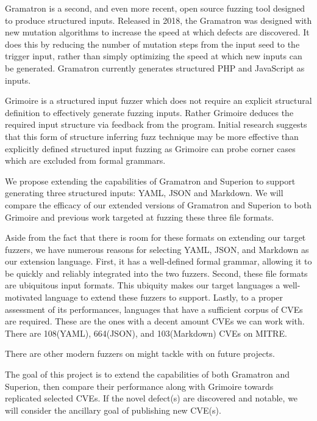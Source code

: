 \documentclass[12pt]{diazessay}
\begin{document}
Gramatron\cite{srivastava2021gramatron} is a second, and even more recent, open source fuzzing tool designed to produce structured inputs.
Released in 2018, the Gramatron was designed with new mutation algorithms to increase the speed at which defects are discovered.
It does this by reducing the number of mutation steps from the input seed to the trigger input, rather than simply optimizing the speed at which new inputs can be generated.
Gramatron currently generates structured PHP and JavaScript as inputs.

Grimoire\cite{GRIMOIRE} is a structured input fuzzer which does not require an explicit structural definition to effectively generate fuzzing inputs.
Rather Grimoire deduces the required input structure via feedback from the program.
Initial research suggests that this form of structure inferring fuzz technique may be more effective than explicitly defined structured input fuzzing as Grimoire can probe corner cases which are excluded from formal grammars.

We propose extending the capabilities of Gramatron and Superion to support generating three structured inputs: YAML\cite{YAMLdraft}, JSON and Markdown.
We will compare the efficacy of our extended versions of Gramatron and Superion to both Grimoire and previous work targeted at fuzzing these three file formats.

Aside from the fact that there is room for these formats on extending our target fuzzers, we have numerous reasons for selecting YAML, JSON, and Markdown as our extension language.
First, it has a well-defined formal grammar, allowing it to be quickly and reliably integrated into the two fuzzers.
Second, these file formats are ubiquitous input formats.
This ubiquity makes our target languages a well-motivated language to extend these fuzzers to support.
Lastly, to a proper assessment of its performances, languages that have a sufficient corpus of CVEs are required. 
These are the ones with a decent amount CVEs we can work with.
There are 108(YAML), 664(JSON), and 103(Markdown) CVEs on MITRE\cite{MITRE}.

There are other modern fuzzers on might tackle with on future projects.

The goal of this project is to extend the capabilities of both Gramatron and Superion, then compare their performance along with Grimoire towards replicated selected CVEs.
If the novel defect(s) are discovered and notable, we will consider the ancillary goal of publishing new CVE(s).
\end{document}
